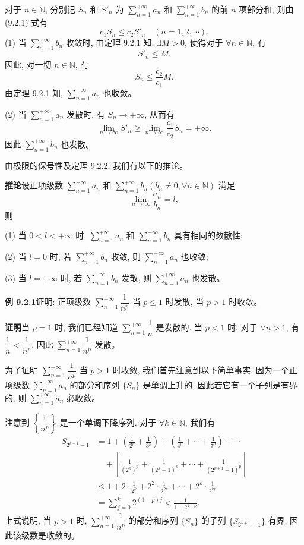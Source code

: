\documentclass[UTF8, 12pt, fontset=fandol, oneside]{ctexart}
\begin{document}
对于 $n\in\mathbb N$, 分别记 $S_n$ 和 $S'_n$ 为 $\sum\limits_{n=1}^{+\infty}a_n$ 和 $\sum\limits_{n=1}^{+\infty}b_n$ 的前 $n$ 项部分和, 则由 (9.2.1) 式有
\[
  c_1S_n\leq c_2S'_n\quad(n=1,2,\cdots).
\]
(1) 当 $\sum\limits_{n=1}^{+\infty}b_n$ 收敛时, 由定理 9.2.1 知, $\exists M>0$, 使得对于 $\forall n\in\mathbb N$, 有
\[
  S'_n\leq M.
\]
因此, 对一切 $n\in\mathbb N$, 有
\[
  S_n\leq\frac{c_2}{c_1}M.
\]
由定理 9.2.1 知, $\sum\limits_{n=1}^{+\infty}a_n$ 也收敛。

(2) 当 $\sum\limits_{n=1}^{+\infty}a_n$ 发散时, 有 $S_n\to+\infty$, 从而有
\[
  \lim_{n\to\infty}S'_n\geq\lim_{n\to\infty}\frac{c_1}{c_2}S_n=+\infty.
\]
因此 $\sum\limits_{n=1}^{+\infty}b_n$ 也发散。

由极限的保号性及定理 9.2.2, 我们有以下的推论。

\noindent\textbf{推论}\quad 设正项级数 $\sum\limits_{n=1}^{+\infty}a_n$ 和 $\sum\limits_{n=1}^{+\infty}b_n(b_n\neq0,\forall n\in\mathbb N)$ 满足
\[
  \lim_{n\to\infty}\frac{a_n}{b_n}=l,
\]
则

(1) 当 $0<l<+\infty$ 时, $\sum\limits_{n=1}^{+\infty}a_n$ 和 $\sum\limits_{n=1}^{+\infty}b_n$ 具有相同的敛散性;

(2) 当 $l=0$ 时, 若 $\sum\limits_{n=1}^{+\infty}b_n$ 收敛, 则 $\sum\limits_{n=1}^{+\infty}a_n$ 也收敛;

(3) 当 $l=+\infty$ 时, 若 $\sum\limits_{n=1}^{+\infty}b_n$ 发散, 则 $\sum\limits_{n=1}^{+\infty}a_n$ 也发散。

\noindent\textbf{例 9.2.1}\quad 证明: 正项级数 $\sum\limits_{n=1}^{+\infty}\dfrac1{n^p}$ 当 $p\leq1$ 时发散, 当 $p>1$ 时收敛。

\noindent\textbf{证明}\quad 当 $p=1$ 时, 我们已经知道 $\sum\limits_{n=1}^{+\infty}\dfrac1n$ 是发散的. 当 $p<1$ 时, 对于 $\forall n>1$, 有 $\dfrac1n<\dfrac1{n^p}$, 因此 $\sum\limits_{n=1}^{+\infty}\dfrac1{n^p}$ 发散。

为了证明 $\sum\limits_{n=1}^{+\infty}\dfrac1{n^p}$ 当 $p>1$ 时收敛, 我们首先注意到以下简单事实: 因为一个正项级数 $\sum\limits_{n=1}^{+\infty}a_n$ 的部分和序列 $\{S_n\}$ 是单调上升的, 因此若它有一个子列是有界的, 则 $\sum\limits_{n=1}^{+\infty}a_n$ 必收敛。

注意到 $\left\{\dfrac1{n^p}\right\}$ 是一个单调下降序列, 对于 $\forall k\in\mathbb N$, 我们有
\[
\begin{aligned}
  S_{2^{k+1}-1}
  &=1+\left(\frac1{2^p}+\frac1{3^p}\right)
    +\left(\frac1{4^p}+\cdots+\frac1{7^p}\right)+\cdots\\
  &\quad+\left[\frac1{(2^k)^p}+\frac1{(2^k+1)^p}+\cdots+\frac1{(2^{k+1}-1)^p}\right]\\
  &\leq1+2\cdot\frac1{2^p}+2^2\cdot\frac1{2^{2p}}+\cdots+2^k\cdot\frac1{2^{kp}}\\
  &=\sum_{j=0}^k2^{(1-p)j}<\frac1{1-2^{1-p}}.
\end{aligned}
\]
上式说明, 当 $p>1$ 时, $\sum\limits_{n=1}^{+\infty}\dfrac1{n^p}$ 的部分和序列 $\{S_n\}$ 的子列 $\{S_{2^{k+1}-1}\}$ 有界, 因此该级数是收敛的。
\end{document}
